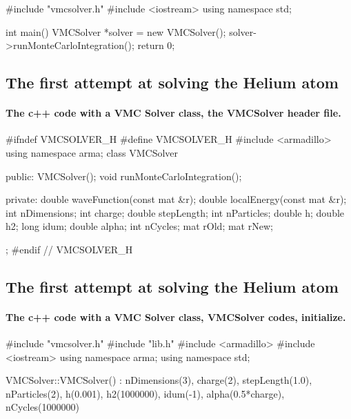 \documentclass[%
twoside,                 %
final,                   %
10pt]{article}
\begin{document}
\bcppcod
#include "vmcsolver.h"
#include <iostream>
using namespace std;

int main()
{
    VMCSolver *solver = new VMCSolver();
    solver->runMonteCarloIntegration();
    return 0;
}
\ecppcod



\subsection{The first attempt at solving the Helium atom}

\paragraph{The c++ code with a VMC Solver class, the VMCSolver header file.}

\bcppcod
#ifndef VMCSOLVER_H
#define VMCSOLVER_H
#include <armadillo>
using namespace arma;
class VMCSolver
{
public:
    VMCSolver();
    void runMonteCarloIntegration();

private:
    double waveFunction(const mat &r);
    double localEnergy(const mat &r);
    int nDimensions;
    int charge;
    double stepLength;
    int nParticles;
    double h;
    double h2;
    long idum;
    double alpha;
    int nCycles;
    mat rOld;
    mat rNew;
};
#endif // VMCSOLVER_H
\ecppcod



\subsection{The first attempt at solving the Helium atom}

\paragraph{The c++ code with a VMC Solver class, VMCSolver codes, initialize.}

\bcppcod
#include "vmcsolver.h"
#include "lib.h"
#include <armadillo>
#include <iostream>
using namespace arma;
using namespace std;

VMCSolver::VMCSolver() :
    nDimensions(3),
    charge(2),
    stepLength(1.0),
    nParticles(2),
    h(0.001),
    h2(1000000),
    idum(-1),
    alpha(0.5*charge),
    nCycles(1000000)
{
}
\ecppcod
\end{document}
